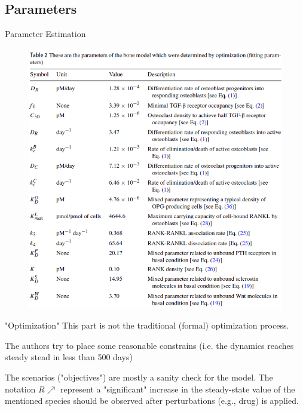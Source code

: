 \documentclass{beamer}
\begin{document}
\subsection{Parameters}
\begin{frame}{Parameter Estimation}
\begin{figure}[h]
	\centering
		\includegraphics[scale=0.45]{../Figures/fig_lemaire_table2.png}
\end{figure}	
\end{frame}

\begin{frame}{"Optimization"}
This part is not the traditional (formal) optimization process. 

The authors try to place some reasonable constrains (i.e. the dynamics reaches steady stead in less than 500 days)

The scenarios ("objectives") are mostly a sanity check for the model. The notation $R\nearrow $ represent a "significant" increase in the steady-state value of the mentioned species should be observed after perturbations (e.g., drug) is applied.
\end{frame}
\end{document}
